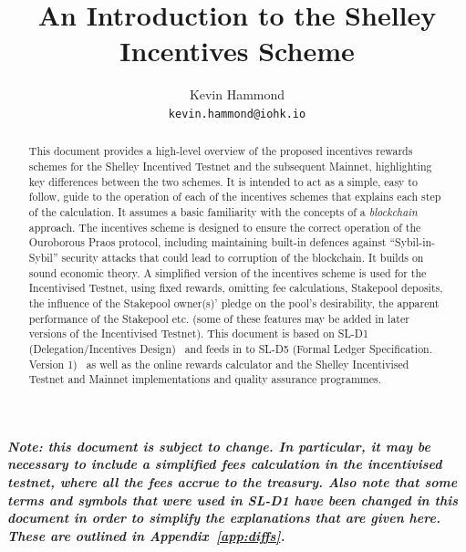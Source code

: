 \documentclass[11pt,a4paper,dvipsnames,twosided,final]{article}
\begin{document}

\title{An Introduction to the Shelley Incentives Scheme}

\author{Kevin Hammond  \\ {\small \texttt{kevin.hammond@iohk.io}}}

\maketitle

\begin{abstract}
  \noindent
  This document provides a high-level overview of the proposed incentives rewards schemes for
  the Shelley Incentived Testnet and the subsequent Mainnet, highlighting key
  differences between the two schemes.  It is intended to act as a
  simple, easy to follow, guide to the operation of each of the incentives schemes that explains each step of the calculation.
  It assumes a basic familiarity with the concepts of a \emph{blockchain} approach.
  The incentives scheme is designed to ensure the correct operation of the Ouroborous Praos
  protocol, including maintaining built-in defences against ``Sybil-in-Sybil'' security attacks
  that could lead to corruption of the blockchain.  It builds on sound economic theory.
  A simplified version of the incentives scheme is used for the Incentivised Testnet, using fixed rewards,
  omitting fee calculations, Stakepool deposits, the influence of the Stakepool owner(s)' pledge on
  the pool's desirability, the apparent performance of the Stakepool etc. (some of these features may be
  added in later versions of the Incentivised Testnet).
  This document is based on SL-D1 (Delegation/Incentives Design)~\cite{delegation_design} and feeds in to SL-D5
  (Formal Ledger Specification. Version 1)~\cite{shelley_spec} as well as the online rewards calculator and the Shelley Incentivised Testnet and Mainnet  implementations and quality assurance programmes.
\end{abstract}

\vspace{3.5in}
\noindent
\textbf{\emph{Note: this document is subject to change.  In particular, it may be necessary to include a simplified fees calculation
    in the incentivised testnet, where all the fees accrue to the treasury.
Also note that some terms and symbols that were used in SL-D1 have been changed in this document
in order to simplify the explanations that are given here.  These are outlined in Appendix~\ref{app:diffs}.
}}
\end{document}
